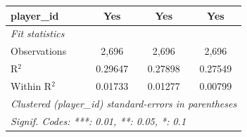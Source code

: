 \begin{tabular}{lccc}
   player\_id                   & Yes           & Yes            & Yes\\  
   \midrule
   \emph{Fit statistics}\\
   Observations                 & 2,696         & 2,696          & 2,696\\  
   R$^2$                        & 0.29647       & 0.27898        & 0.27549\\  
   Within R$^2$                 & 0.01733       & 0.01277        & 0.00799\\  
   \midrule \midrule
   \multicolumn{4}{l}{\emph{Clustered (player\_id) standard-errors in parentheses}}\\
   \multicolumn{4}{l}{\emph{Signif. Codes: ***: 0.01, **: 0.05, *: 0.1}}\\
\end{tabular}
\par\endgroup


